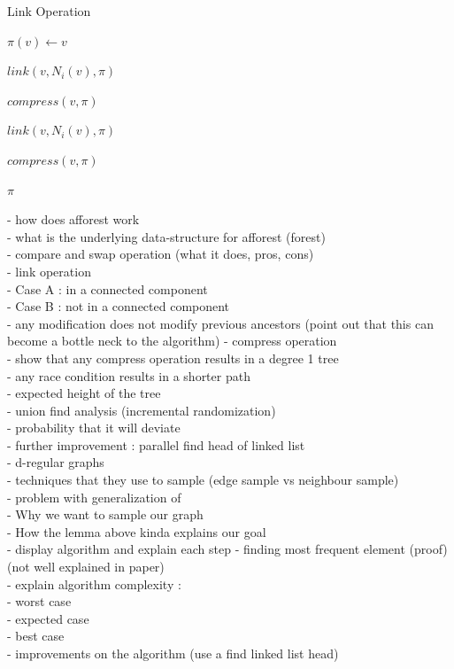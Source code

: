 \documentclass[]{article}
\begin{document}
\begin{algorithm}
\caption{Link Operation}\label{euclid}
\begin{algorithmic}[1]

\State $\pi(v) \gets v$
\EndFor

  \State $link(v,N_i(v),\pi)$
  \EndFor
\EndFor


\State $compress(v,\pi)$
\EndFor


  \State $link(v,N_i(v),\pi)$
  \EndFor
\EndFor


\State $compress(v,\pi)$
\EndFor

\Return $\pi$
\EndProcedure
\end{algorithmic}
\end{algorithm}

 - how does afforest work\\
 - what is the underlying data-structure for afforest (forest)\\
 - compare and swap operation (what it does, pros, cons)\\
 - link operation\\
 - Case A : in a connected component\\
 - Case B : not in a connected component\\
 - any modification does not modify previous ancestors (point out that this can\\ become a bottle neck to the algorithm)
 - compress operation\\
 - show that any compress operation results in a degree 1 tree\\
 - any race condition results in a shorter path\\
 - expected height of the tree\\
 - union find analysis (incremental randomization) \\
 - probability that it will deviate \\
 - further improvement : parallel find head of linked list\\
 - d-regular graphs\\
 - techniques that they use to sample (edge sample vs neighbour sample)\\
 - problem with generalization of\\
 - Why we want to sample our graph\\
 - How the lemma above kinda explains our goal\\
 - display algorithm and explain each step
 - finding most frequent element (proof) (not well explained in paper)\\
 - explain algorithm complexity :\\
    - worst case\\
    - expected case\\
    - best case\\
- improvements on the algorithm (use a find linked list head)\\
 
\end{document}
